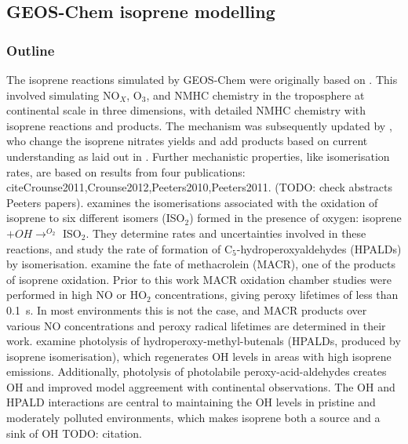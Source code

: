   \subsection{GEOS-Chem isoprene modelling}
    \label{Model:GC:Isop}

    \subsubsection{Outline}
      The isoprene reactions simulated by GEOS-Chem were originally based on \textcite{Horowitz1998}.
      This involved simulating NO$_X$, O$_3$, and NMHC chemistry in the troposphere at continental scale in three dimensions, with detailed NMHC chemistry with isoprene reactions and products.
      The mechanism was subsequently updated by \textcite{Mao2013}, who change the isoprene nitrates yields and add products based on current understanding as laid out in \textcite{Paulot2009a,Paulot2009b}.
      Further mechanistic properties, like isomerisation rates, are based on results from four publications: cite{Crounse2011,Crounse2012,Peeters2010,Peeters2011}.
      (TODO: check abstracts Peeters papers).
      \textcite{Crounse2011} examines the isomerisations associated with the oxidation of isoprene to six different isomers (ISO$_2$) formed in the presence of oxygen: isoprene $ + OH \rightarrow^{O_2} $ ISO$_2$.
      They determine rates and uncertainties involved in these reactions, and study the rate of formation of C$_5$-hydroperoxyaldehydes (HPALDs) by isomerisation.
      \textcite{Crounse2012} examine the fate of methacrolein (MACR), one of the products of isoprene oxidation. 
      Prior to this work MACR oxidation chamber studies were performed in high NO or HO$_2$ concentrations, giving peroxy lifetimes of less than 0.1~s.
      In most environments this is not the case, and MACR products over various NO concentrations and peroxy radical lifetimes are determined in their work.
      \textcite{Peeters2010} examine photolysis of hydroperoxy-methyl-butenals (HPALDs, produced by isoprene isomerisation), which regenerates OH levels in areas with high isoprene emissions.
      Additionally, photolysis of photolabile peroxy-acid-aldehydes creates OH and improved model aggreement with continental observations.
      The OH and HPALD interactions are central to maintaining the OH levels in pristine and moderately polluted environments, which makes isoprene both a source and a sink of OH TODO: citation.
      
